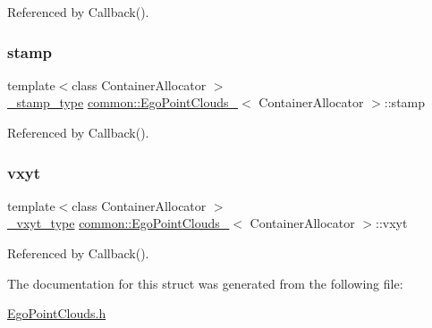 Referenced by Callback().

\mbox{\label{structcommon_1_1EgoPointClouds___a14e74473df2663017f1de20086293873}} 
\subsubsection{\texorpdfstring{stamp}{stamp}}
{\footnotesize\ttfamily template$<$class Container\+Allocator $>$ \\
\hyperlink{structcommon_1_1EgoPointClouds___a45a194b26ca8e4132a7d5e02e659d68f}{\+\_\+stamp\+\_\+type} \hyperlink{structcommon_1_1EgoPointClouds__}{common\+::\+Ego\+Point\+Clouds\+\_\+}$<$ Container\+Allocator $>$\+::stamp}



Referenced by Callback().

\mbox{\label{structcommon_1_1EgoPointClouds___a7e0628045c2815ba8ab5be4305ad7851}} 
\subsubsection{\texorpdfstring{vxyt}{vxyt}}
{\footnotesize\ttfamily template$<$class Container\+Allocator $>$ \\
\hyperlink{structcommon_1_1EgoPointClouds___a92f4c266292be35a268030b544d34d6d}{\+\_\+vxyt\+\_\+type} \hyperlink{structcommon_1_1EgoPointClouds__}{common\+::\+Ego\+Point\+Clouds\+\_\+}$<$ Container\+Allocator $>$\+::vxyt}



Referenced by Callback().



The documentation for this struct was generated from the following file\+:\begin{DoxyCompactItemize}
\item 
\hyperlink{EgoPointClouds_8h}{Ego\+Point\+Clouds.\+h}\end{DoxyCompactItemize}
